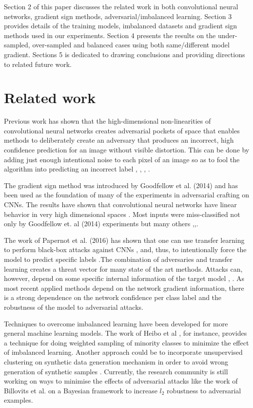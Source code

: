 \documentclass[runningheads,a4paper]{llncs}
\begin{document}
Section 2 of this paper discusses the related work in both convolutional neural networks, gradient sign methods, adversarial/imbalanced learning. Section 3 provides details of the training models, imbalanced datasets and gradient sign methods used in our experiments. Section 4 presents the results on the under-sampled, over-sampled and balanced cases using both same/different model gradient. Sections 5 is dedicated to drawing conclusions and providing directions to related future work.
\section{Related work}


Previous work has shown that the high-dimensional non-linearities of convolutional neural networks \cite{lawrence1997face} creates adversarial pockets of space \cite{billovits} that enables methods to deliberately create an adversary that produces an incorrect, high confidence prediction for an image without visible distortion. This can be done by adding just enough intentional noise to each pixel of an image so as to fool the algorithm into predicting an incorrect label \cite{goodfellow2014}, \cite{goodfellow2016}, \cite{papernot2016transf}, \cite{szegedy2013}.

The gradient sign method was introduced by Goodfellow et al. (2014) and has been used as the foundation of many of the experiments in adversarial crafting on CNNs. The results have shown that convolutional neural networks have linear behavior in very high dimensional spaces \cite{goodfellow2014}.  Most inputs were miss-classified not only by Goodfellow et. al (2014) experiments but many others \cite{billovits},\cite{goodfellow2016},\cite{papernot2016}.

The work of Papernot et al. (2016) has shown that one can use transfer learning to perform black-box attacks against CNNs \cite{papernot2016transf}, \cite{yosinski2014transferable} and, thus, to intentionally force the model to predict specific labels .The combination of adversaries and transfer learning creates a threat vector for many state of the art methods. Attacks can, however, depend on some specific internal information of the target model \cite{lowd2005}, \cite{papernot2016transf}. As most recent applied methods depend on the network gradient information, there is a strong dependence on the network confidence per class label and the robustness of the model to adversarial attacks.

Techniques to overcome imbalanced learning have been developed for more general machine learning models. The work of Heibo et al \cite{he2008adasyn}, for instance, provides a technique for doing weighted sampling of minority classes to minimize the effect of imbalanced learning. Another approach could be to incorporate unsupervised clustering on synthetic data generation mechanism in order to avoid wrong generation of synthetic samples \cite{Barua2011}. Currently, the research community is still working on ways to minimise the effects of adversarial attacks like the work of Billovits et al. \cite{billovits} on a Bayesian framework to increase $l_2$ robustness to adversarial examples.
\end{document}
